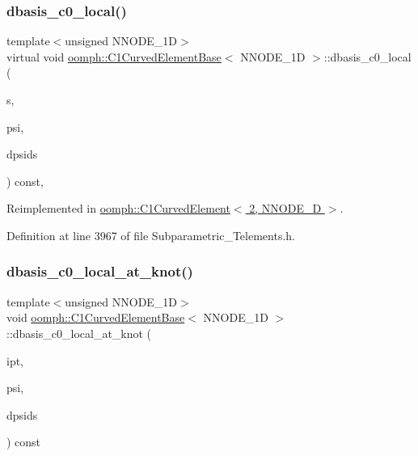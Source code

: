 \subsubsection{\texorpdfstring{dbasis\+\_\+c0\+\_\+local()}{dbasis\_c0\_local()}}
{\footnotesize\ttfamily template$<$unsigned N\+N\+O\+D\+E\+\_\+1D$>$ \\
virtual void \hyperlink{classoomph_1_1C1CurvedElementBase}{oomph\+::\+C1\+Curved\+Element\+Base}$<$ N\+N\+O\+D\+E\+\_\+1D $>$\+::dbasis\+\_\+c0\+\_\+local (\begin{DoxyParamCaption}\item[{const \hyperlink{classoomph_1_1Vector}{Vector}$<$ double $>$ \&}]{s,  }\item[{\hyperlink{classoomph_1_1Shape}{Shape} \&}]{psi,  }\item[{\hyperlink{classoomph_1_1DShape}{D\+Shape} \&}]{dpsids }\end{DoxyParamCaption}) const\hspace{0.3cm}{\ttfamily [inline]}, {\ttfamily [virtual]}}



Reimplemented in \hyperlink{classoomph_1_1C1CurvedElement_3_012_00_01NNODE__1D_01_4_a51fd0d8ec09057548696aa99562b9f5a}{oomph\+::\+C1\+Curved\+Element$<$ 2, N\+N\+O\+D\+E\+\_\+D $>$}.



Definition at line 3967 of file Subparametric\+\_\+\+Telements.\+h.

\mbox{\label{classoomph_1_1C1CurvedElementBase_a3c986f9ab0c04b4d7a8ca2ae39c37902}} 
\subsubsection{\texorpdfstring{dbasis\+\_\+c0\+\_\+local\+\_\+at\+\_\+knot()}{dbasis\_c0\_local\_at\_knot()}}
{\footnotesize\ttfamily template$<$unsigned N\+N\+O\+D\+E\+\_\+1D$>$ \\
void \hyperlink{classoomph_1_1C1CurvedElementBase}{oomph\+::\+C1\+Curved\+Element\+Base}$<$ N\+N\+O\+D\+E\+\_\+1D $>$\+::dbasis\+\_\+c0\+\_\+local\+\_\+at\+\_\+knot (\begin{DoxyParamCaption}\item[{const unsigned \&}]{ipt,  }\item[{\hyperlink{classoomph_1_1Shape}{Shape} \&}]{psi,  }\item[{\hyperlink{classoomph_1_1DShape}{D\+Shape} \&}]{dpsids }\end{DoxyParamCaption}) const\hspace{0.3cm}{\ttfamily [inline]}}



